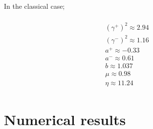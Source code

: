 \documentclass[a4paper, 12pt]{report}
\begin{document}
In the classical case;

\begin{multline}
\\
(\gamma^+)^2 \approx 2.94 \\
(\gamma^-)^2 \approx 1.16 \\
a^+ \approx -0.33 \\
a^- \approx 0.61 \\
b \approx 1.037 \\
\mu \approx 0.98\\
\eta \approx 11.24 \\
\end{multline} 

\chapter{Numerical results}
\end{document}
